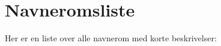 \section{Navneromsliste}
Her er en liste over alle navnerom med korte beskrivelser\+:\begin{DoxyCompactList}
\item{}
\end{DoxyCompactList}
